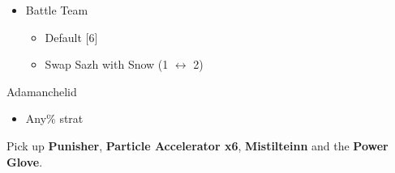 \begin{menu}
	\begin{itemize}
		\paradigm
		\begin{itemize}
			\item Battle Team
				\begin{itemize}
					\item Default [6]
					\item Swap Sazh with Snow (1 $\leftrightarrow$ 2)
				\end{itemize}
		\end{itemize}
	\end{itemize}
\end{menu}

\begin{battle}{Adamanchelid}
	\begin{itemize}
		\item Any\% strat
	\end{itemize}
\end{battle}

Pick up \textbf{Punisher}, \textbf{Particle Accelerator x6}, \textbf{Mistilteinn} and the \textbf{Power Glove}.

